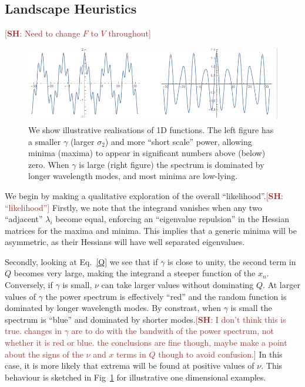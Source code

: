 \documentclass[12pt]{article}
\newcommand{\SH}[1]{\textcolor{brown}{[{\bf SH}: #1]}}
\begin{document}
\subsection{Landscape Heuristics}
\SH{Need to change $F$ to $V$ throughout}
\begin{figure}
  \centering
  
  \includegraphics[width=\linewidth]{TwoSigmas.png}
  \caption{We show illustrative realisations of 1D functions. The left figure has a smaller $\gamma$ (larger $\sigma_2$) and more “short scale” power, allowing minima (maxima) to appear in significant numbers above (below) zero. When $\gamma$ is large (right figure) the spectrum is dominated by longer wavelength modes, and most minima are low-lying.}
  \label{examples1}
\end{figure}

We begin by making a qualitative exploration of the overall ``likelihood''.\SH{``likelihood''} Firstly, we note that the integrand vanishes when any two ``adjacent'' $\lambda_i$ become equal, enforcing an ``eigenvalue repulsion'' in the Hessian matrices for the maxima and minima. This implies that a generic minima will be asymmetric, as their Hessians will have well separated eigenvalues.   

Secondly,  looking at Eq.~\ref{Q} we see that if $\gamma$ is close to unity,  the second term in $Q$ becomes very large, making the integrand a steeper function of the $x_n$. Conversely, if   $\gamma$ is small, $\nu$ can take larger values without dominating $Q$.  At larger values of $\gamma$ the power spectrum is effectively ``red'' and the random function is dominated by longer wavelength modes. By constrast, when $\gamma$ is small the spectrum is ``blue'' and dominated by shorter modes.\SH{I don't think this is true. changes in $\gamma$ are to do with the bandwith of the power spectrum, not whether it is red or blue. the conclusions are fine though, maybe make a point about the signs of the $\nu$ and $x$ terms in $Q$ though to avoid confusion.} In this case, it is more likely that extrema will be found at positive values of $\nu$. This behaviour is sketched in Fig~\ref{examples1} for illustrative one dimensional examples. 
\end{document}
